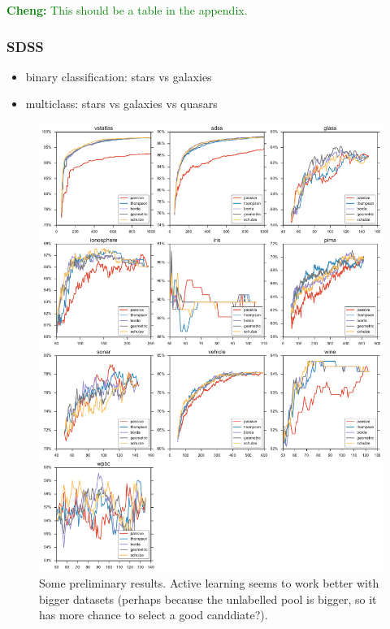\documentclass[fleqn,10pt,lineno]{wlpeerj} %
\newcommand{\cheng}[1]{\textcolor{green}{\textbf{Cheng: }{\footnotesize #1}}}
\begin{document}
\cheng{This should be a table in the appendix.}

\subsubsection*{SDSS}

\begin{itemize}
  \item binary classification: stars vs galaxies
  \item multiclass: stars vs galaxies vs quasars
\end{itemize}


\begin{figure}[tbp]
	\centering
	\includegraphics[width=\textwidth]{figures/learning_curves}
	\caption[Some preliminary results.]{Some preliminary results. Active learning seems
    		 to work better with bigger datasets (perhaps because the unlabelled pool
             is bigger, so it has more chance to select a good canddiate?). }
	\label{fig:learning_curves}
\end{figure}
\end{document}
